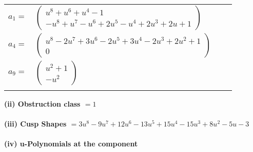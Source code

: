 \documentclass[1p]{elsarticle_modified}
\theoremstyle{definition}
\begin{document}
\begin{tabular}{m{7pt} m{180pt} m{7pt} m{180pt} }
\flushright $a_{1}=$&$\begin{pmatrix}u^8+u^6+u^4-1\\- u^8+u^7- u^6+2 u^5- u^4+2 u^3+2 u+1\end{pmatrix}$ \\
\flushright $a_{4}=$&$\begin{pmatrix}u^8-2 u^7+3 u^6-2 u^5+3 u^4-2 u^3+2 u^2+1\\0\end{pmatrix}$ \\
\flushright $a_{9}=$&$\begin{pmatrix}u^2+1\\- u^2\end{pmatrix}$\\&\end{tabular}
\flushleft \textbf{(ii) Obstruction class $= 1$}\\~\\
\flushleft \textbf{(iii) Cusp Shapes $= 3 u^8-9 u^7+12 u^6-13 u^5+15 u^4-15 u^3+8 u^2-5 u-3$}\\~\\
\newpage\renewcommand{\arraystretch}{1}
\flushleft \textbf{(iv) u-Polynomials at the component}\newline \\
\end{document}

